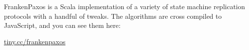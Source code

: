 FrankenPaxos is a Scala implementation of a variety of state machine
replication protocols with a handful of tweaks. The algorithms are cross
compiled to JavaScript, and you can see them here:

\begin{center}
  \huge
  \url{tiny.cc/frankenpaxos}
\end{center}
